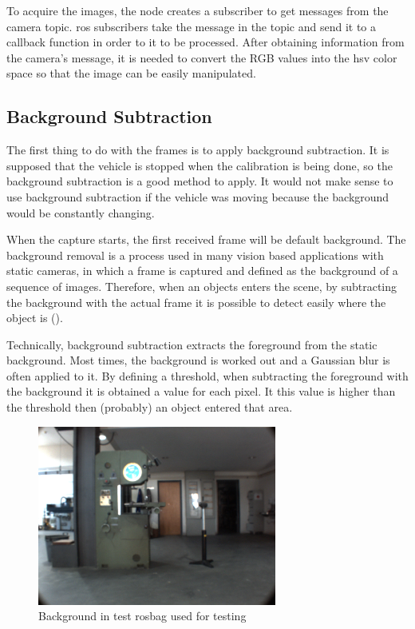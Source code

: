 To acquire the images, the node creates a subscriber to get messages from the camera topic. \gls{ros} subscribers take the message in the topic and send it to a callback function in order to it to be processed. After obtaining information from the camera's message, it is needed to convert the RGB values into the \gls{hsv} color space so that the image can be easily manipulated.

\subsection{Background Subtraction}

The first thing to do with the frames is to apply background subtraction. It is supposed that the vehicle is stopped when the calibration is being done, so the background subtraction is a good method to apply. It would not make sense to use background subtraction if the vehicle was moving because the background would be constantly changing.

When the capture starts, the first received frame will be default background. The background removal is a process used in many vision based applications with static cameras, in which a frame is captured and defined as the background of a sequence of images. Therefore, when an objects enters the scene, by subtracting the background with the actual frame it is possible to detect easily where the object is (\cite{OpenCV}).

Technically, background subtraction extracts the foreground from the static background. Most times, the background is worked out and a Gaussian blur is often applied to it. By defining a threshold, when subtracting the foreground with the background it is obtained a value for each pixel. It this value is higher than the threshold then (probably) an object entered that area.

\begin{figure}[htp]
	
	\centering
	\includegraphics[width=0.7\textwidth]{capcalib/imgs/background.png}
	
	\caption{Background in test rosbag used for testing}
	\label{fig:background}
	
\end{figure}

